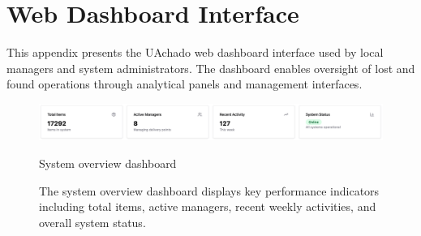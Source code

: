\chapter{Web Dashboard Interface} \label{app:web_dashboard}

This appendix presents the UAchado web dashboard interface used by local managers and system administrators. The dashboard enables oversight of lost and found operations through analytical panels and management interfaces.

\begin{figure}[h]
    \centering
    \includegraphics[width=\textwidth]{figs/appendix/web/1.png}
    \caption{System overview dashboard }
    \caption*{The system overview dashboard displays key performance indicators including total items, active managers, recent weekly activities, and overall system status.}
    \label{fig:web_dashboard_overview}
\end{figure}

